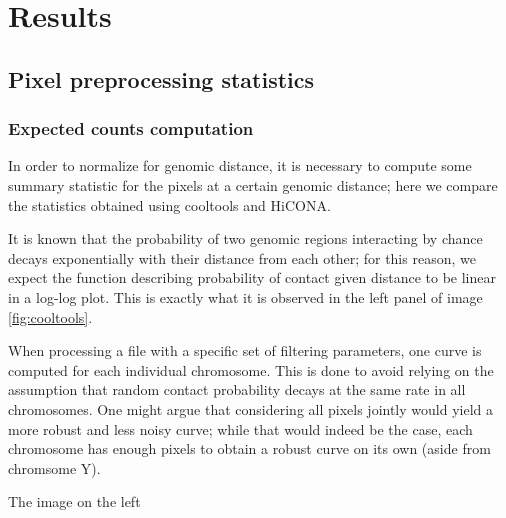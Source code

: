 \graphicspath{{chapters/05_results/images}}
\chapter{Results}


\section{Pixel preprocessing statistics}

\subsection{Expected counts computation}

In order to normalize for genomic distance, it is necessary to compute some summary statistic for the pixels at a certain genomic distance; here we compare the statistics obtained using cooltools and HiCONA. 

It is known that the probability of two genomic regions interacting by chance decays exponentially with their distance from each other; for this reason, we expect the function describing probability of contact given distance to be linear in a log-log plot. This is exactly what it is observed in the left panel of image \ref{fig:cooltools}.

When processing a file with a specific set of filtering parameters, one curve is computed for each individual chromosome. This is done to avoid relying on the assumption that random contact probability decays at the same rate in all chromosomes. One might argue that considering all pixels jointly would yield a more robust and less noisy curve; while that would indeed be the case, each chromosome has enough pixels to obtain a robust curve on its own (aside from chromsome Y).

The image on the left 



